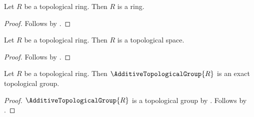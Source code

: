 \begin{classification}\label{topological_ring_is_ring}
    Let $R$ be a topological ring.
    Then $R$ is a ring.
\end{classification}
\begin{proof}
    Follows by .
\end{proof}

\begin{classification}\label{topological_ring_is_topological_space}
    Let $R$ be a topological ring.
    Then $R$ is a topological space.
\end{classification}
\begin{proof}
    Follows by .
\end{proof}

\begin{theorem}\label{additive_topological_group_is_exact}
    Let $R$ be a topological ring.
    Then $\AdditiveTopologicalGroup{R}$ is an exact topological group.
\end{theorem}
\begin{proof}
    $\AdditiveTopologicalGroup{R}$ is a topological group
        by .
    Follows by
        .
\end{proof}

